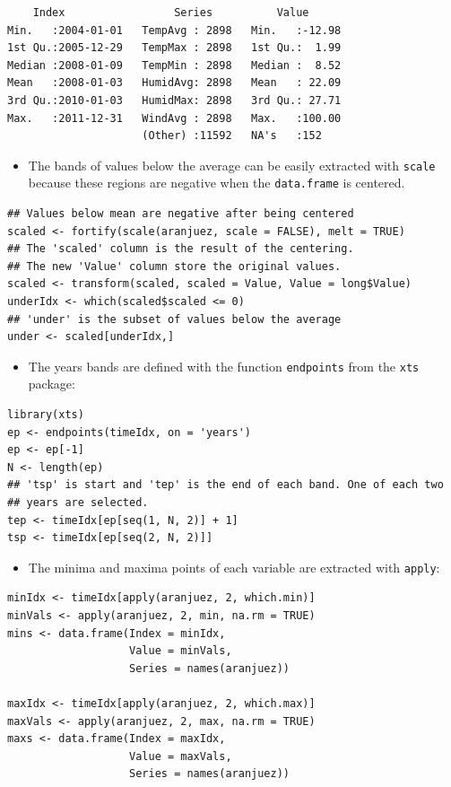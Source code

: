 \begin{verbatim}
    Index                 Series          Value       
Min.   :2004-01-01   TempAvg : 2898   Min.   :-12.98  
1st Qu.:2005-12-29   TempMax : 2898   1st Qu.:  1.99  
Median :2008-01-09   TempMin : 2898   Median :  8.52  
Mean   :2008-01-03   HumidAvg: 2898   Mean   : 22.09  
3rd Qu.:2010-01-03   HumidMax: 2898   3rd Qu.: 27.71  
Max.   :2011-12-31   WindAvg : 2898   Max.   :100.00  
                     (Other) :11592   NA's   :152
\end{verbatim}

\begin{itemize}
\item The bands of values below the average can be easily extracted with
\texttt{scale} because these regions are negative when the \texttt{data.frame} is
centered.
\end{itemize}


\lstset{language=r,label= ,caption= ,captionpos=b,numbers=none}
\begin{lstlisting}
## Values below mean are negative after being centered
scaled <- fortify(scale(aranjuez, scale = FALSE), melt = TRUE)
## The 'scaled' column is the result of the centering.
## The new 'Value' column store the original values.
scaled <- transform(scaled, scaled = Value, Value = long$Value)
underIdx <- which(scaled$scaled <= 0)
## 'under' is the subset of values below the average
under <- scaled[underIdx,]
\end{lstlisting}

\begin{itemize}
\item The years bands are defined with the function \texttt{endpoints} from the
\texttt{xts} package:
\end{itemize}


\lstset{language=r,label= ,caption= ,captionpos=b,numbers=none}
\begin{lstlisting}
library(xts)
ep <- endpoints(timeIdx, on = 'years')
ep <- ep[-1]
N <- length(ep)
## 'tsp' is start and 'tep' is the end of each band. One of each two
## years are selected.
tep <- timeIdx[ep[seq(1, N, 2)] + 1]
tsp <- timeIdx[ep[seq(2, N, 2)]]
\end{lstlisting}
\begin{itemize}
\item The minima and maxima points of each variable are extracted with
\texttt{apply}:
\end{itemize}
\lstset{language=r,label= ,caption= ,captionpos=b,numbers=none}
\begin{lstlisting}
minIdx <- timeIdx[apply(aranjuez, 2, which.min)]
minVals <- apply(aranjuez, 2, min, na.rm = TRUE)
mins <- data.frame(Index = minIdx,
                   Value = minVals,
                   Series = names(aranjuez))

maxIdx <- timeIdx[apply(aranjuez, 2, which.max)]
maxVals <- apply(aranjuez, 2, max, na.rm = TRUE)
maxs <- data.frame(Index = maxIdx,
                   Value = maxVals,
                   Series = names(aranjuez))
\end{lstlisting}

